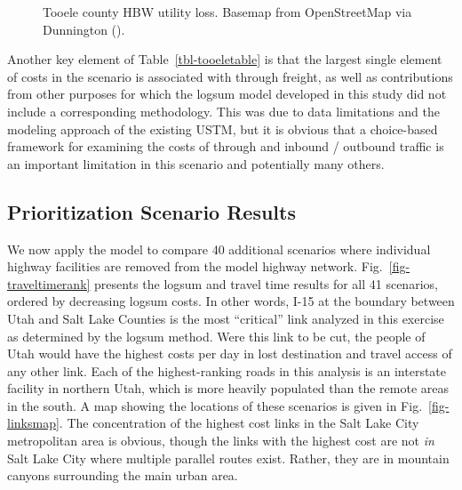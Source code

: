 \documentclass[]{ascelike-new}
\begin{document}
\begin{figure}


\caption{\label{fig-tooelemap}Tooele county HBW utility loss. Basemap
from OpenStreetMap via Dunnington ().}

\end{figure}%

Another key element of Table~\ref{tbl-tooeletable} is that the largest
single element of costs in the scenario is associated with through
freight, as well as contributions from other purposes for which the
logsum model developed in this study did not include a corresponding
methodology. This was due to data limitations and the modeling approach
of the existing USTM, but it is obvious that a choice-based framework
for examining the costs of through and inbound / outbound traffic is an
important limitation in this scenario and potentially many others.

\subsection{Prioritization Scenario
Results}\label{prioritization-scenario-results}

We now apply the model to compare 40 additional scenarios where
individual highway facilities are removed from the model highway
network. Fig.~\ref{fig-traveltimerank} presents the logsum and travel
time results for all 41 scenarios, ordered by decreasing logsum costs.
In other words, I-15 at the boundary between Utah and Salt Lake Counties
is the most ``critical'' link analyzed in this exercise as determined by
the logsum method. Were this link to be cut, the people of Utah would
have the highest costs per day in lost destination and travel access of
any other link. Each of the highest-ranking roads in this analysis is an
interstate facility in northern Utah, which is more heavily populated
than the remote areas in the south. A map showing the locations of these
scenarios is given in Fig.~\ref{fig-linksmap}. The concentration of the
highest cost links in the Salt Lake City metropolitan area is obvious,
though the links with the highest cost are not \emph{in} Salt Lake City
where multiple parallel routes exist. Rather, they are in mountain
canyons surrounding the main urban area.
\end{document}
